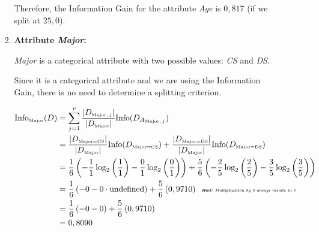 \documentclass[
english,
smallborders
]{i6prcsht}
\newcommand{\OfSpecificValue}[3]{_{\text{\tiny #1#2#3}}}
\newcommand{\OfAttribute}[1]{_{\text{\tiny #1}}}
\begin{document}
\begin{solution}
\begin{enumerate}
\begin{enumerate}
\begin{enumerate}
\begin{enumerate}
				                  \end{enumerate}

				                  Therefore, the Information Gain for the attribute \textit{Age} is $0,817$ (if we split at $25,0$).

				            \item \textbf{Attribute \textit{Major}:}

				                  \textit{Major} is a categorical attribute with two possible values: \textit{CS} and \textit{DS}.

				                  Since it is a categorical attribute and we are using the Information Gain, there is no need to determine a splitting criterion.

				                  \begin{alignat*}{2}
					                  \text{Info}\OfAttribute{Major}(D) & = \sum_{j=1}^v \frac{|D\OfAttribute{Major$,j$}|}{|D\OfAttribute{Major}|} \text{Info}(D_{A\OfAttribute{Major$,j$}})                                                                                                                      \\
					                                                    & = \frac{|D\OfSpecificValue{Major}{=}{CS}|}{|D\OfAttribute{Major}|} \text{Info}(D\OfSpecificValue{Major}{=}{CS}) + \frac{|D\OfSpecificValue{Major}{=}{DS}|}{|D\OfAttribute{Major}|} \text{Info}(D\OfSpecificValue{Major}{=}{DS})         \\
					                                                    & = \frac{1}{6} \left(-\frac{1}{1} \log_2\left(\frac{1}{1}\right) - \frac{0}{1} \log_2\left(\frac{0}{1}\right)\right) + \frac{5}{6} \left(-\frac{2}{5} \log_2\left(\frac{2}{5}\right) - \frac{3}{5} \log_2\left(\frac{3}{5}\right)\right) \\
					                                                    & = \frac{1}{6} \left(- 0 - 0 \cdot \text{undefined}\right) + \frac{5}{6} \left(0,9710\right) \text{\tiny \textit{\hspace{0,2cm}\textbf{Hint:} Multiplication by 0 always results in 0}}                                                  \\
					                                                    & = \frac{1}{6} \left(- 0 - 0 \right) + \frac{5}{6} \left(0,9710\right)                                                                                                                                                                   \\
					                                                    & = 0,8090                                                                                                                                                                                                                                \\

\end{alignat*}
\end{enumerate}
\end{enumerate}
\end{enumerate}
\end{solution}
\end{document}
